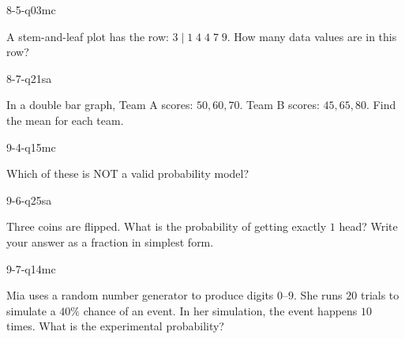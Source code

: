 \begin{practiceQuestion}{8-5-q03}{mc}
\begin{questionText}
A stem-and-leaf plot has the row: $3 \mid 1\;4\;4\;7\;9$. How many data values are in this row?
\end{questionText}
\end{practiceQuestion}

\begin{practiceQuestion}{8-7-q21}{sa}
\begin{questionText}
In a double bar graph, Team A scores: $50, 60, 70$. Team B scores: $45, 65, 80$. Find the mean for each team.
\end{questionText}
\end{practiceQuestion}

\begin{practiceQuestion}{9-4-q15}{mc}
\begin{questionText}
Which of these is NOT a valid probability model?
\end{questionText}
\end{practiceQuestion}

\begin{practiceQuestion}{9-6-q25}{sa}
\begin{questionText}
Three coins are flipped. What is the probability of getting exactly $1$ head? Write your answer as a fraction in simplest form.
\end{questionText}
\end{practiceQuestion}

\begin{practiceQuestion}{9-7-q14}{mc}
\begin{questionText}
Mia uses a random number generator to produce digits $0$--$9$. She runs $20$ trials to simulate a $40\%$ chance of an event. In her simulation, the event happens $10$ times. What is the experimental probability?
\end{questionText}
\end{practiceQuestion}
